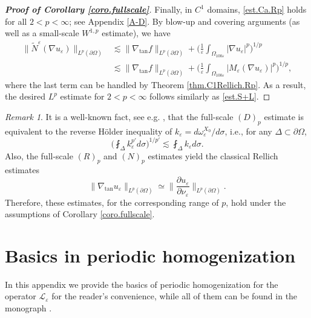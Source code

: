 \documentclass[reqno,12pt]{amsart} %
\theoremstyle{definition}
\theoremstyle{remark}
\newtheorem{remark}[theorem]{Remark}
\numberwithin{equation}{section}
\newcommand{\cL}{\mathcal{L}}
\newcommand{\e}{\varepsilon}
\begin{document}
\begin{proof}[\textbf{Proof of Corollary \ref{coro.fullscale}}]
    Finally, in $C^1$ domains, \eqref{est.Ca.Rp} holds for all $2<p<\infty$; see Appendix \ref{A-D}. By blow-up and covering arguments (as well as a small-scale $W^{1,p}$ estimate), we have
    \begin{equation}
    \begin{aligned}
        \| \widetilde{N}^\e(\nabla u_\e) \|_{L^p(\partial \Omega)} & \lesssim \| \nabla_{\tan} f \|_{L^p(\partial \Omega)} + \bigg( \frac{1}{\e} \int_{\Omega_{100\e}} |\nabla u_\e|^p \bigg)^{1/p} \\
        & \lesssim \| \nabla_{\tan} f \|_{L^p(\partial \Omega)} + \bigg( \frac{1}{\e} \int_{\Omega_{100\e}} |M_\e(\nabla u_\e)|^p \bigg)^{1/p},
        \end{aligned}
    \end{equation}
    where the last term can be handled by Theorem \ref{thm.C1Rellich.Rp}. As a result, the desired $L^p$ estimate for $2<p<\infty$ follows similarly as \eqref{est.S+L}.
\end{proof}

\begin{remark}
    It is a well-known fact, see e.g. \cite[Theorem 1.5]{FKP91}, that the full-scale $(D)_p$ estimate is equivalent to the reverse H\"{o}lder inequality of $ k_\e = d\omega^{X_0}_\e/d\sigma $, i.e., for any $\Delta \subset \partial \Omega$,
    \begin{equation}
        \bigg( \fint_{\Delta} k_\e^{p'} d\sigma \bigg)^{1/p'} \lesssim \fint_{\Delta} k_\e d\sigma.
    \end{equation}
    Also, the full-scale $(R)_p$ and $(N)_p$ estimates yield the classical Rellich estimates
    \begin{equation}
        \| \nabla_{\tan} u_\e \|_{L^p(\partial \Omega)} \simeq \Big\| \frac{\partial u_\e}{\partial \nu_\e} \Big\|_{L^p(\partial \Omega)}.
    \end{equation}
    Therefore, these estimates, for the corresponding range of $p$, hold under the assumptions of Corollary \ref{coro.fullscale}.
\end{remark}

\appendix

\section{Basics in periodic homogenization}
\label{Appendix-A}
In this appendix we provide the basics of periodic homogenization for the operator $\cL_\e$ for the reader's convenience, while all of them can be found in the monograph \cite{ShenBook}. 
\end{document}
